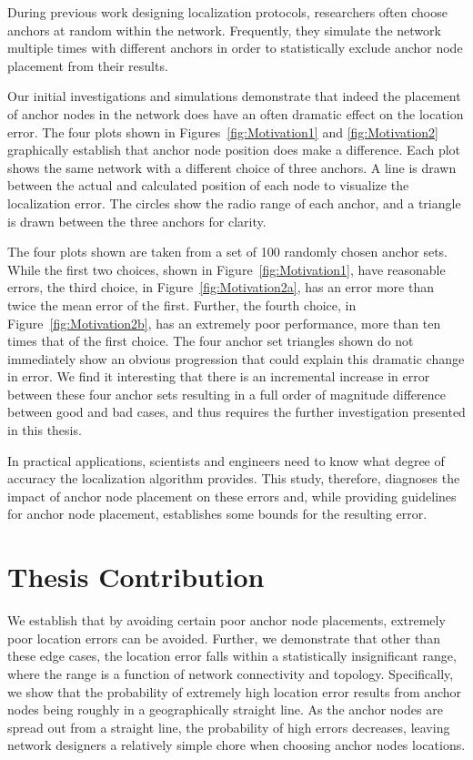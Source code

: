 During previous work designing localization protocols\cite[p. 11]{CCA-MAP09}\cite[p.2 ]{MDS-MAP}, researchers often choose anchors at random within the network.  Frequently, they simulate the network multiple times with different anchors in order to statistically exclude anchor node placement from their results. 

Our initial investigations and simulations demonstrate that indeed the placement of anchor nodes in the network does have an often dramatic effect on the location error.  The four plots shown in Figures~\ref{fig:Motivation1} and \ref{fig:Motivation2} graphically establish that anchor node position does make a difference.  Each plot shows the same network with a different choice of three anchors.  A line is drawn between the actual and calculated position of each node to visualize the localization error.  The circles show the radio range of each anchor, and a triangle is drawn between the three anchors for clarity.  

The four plots shown are taken from a set of 100 randomly chosen anchor sets.  While the first two choices, shown in Figure~\ref{fig:Motivation1}, have reasonable errors, the third choice, in Figure~\ref{fig:Motivation2a}, has an error more than twice the mean error of the first.  Further, the fourth choice, in Figure~\ref{fig:Motivation2b}, has an extremely poor performance, more than ten times that of the first choice.  The four anchor set triangles shown do not immediately show an obvious progression that could explain this dramatic change in error. We find it interesting that there is an incremental increase in error between these four anchor sets resulting in a full order of magnitude difference between good and bad cases, and thus requires the further investigation presented in this thesis.

In practical applications, scientists and engineers need to know what degree of accuracy the localization algorithm provides. This study, therefore, diagnoses the impact of anchor node placement on these errors and, while providing guidelines for anchor node placement, establishes some bounds for the resulting error. 

\section{Thesis Contribution}
We establish that by avoiding certain poor anchor node placements, extremely poor location errors can be avoided.  Further, we demonstrate that other than these edge cases, the location error falls within a statistically insignificant range, where the range is a function of network connectivity and topology.  Specifically, we show that the probability of extremely high location error results from anchor nodes being roughly in a geographically straight line.  As the anchor nodes are spread out from a straight line, the probability of high errors decreases, leaving network designers a relatively simple chore when choosing anchor nodes locations.


